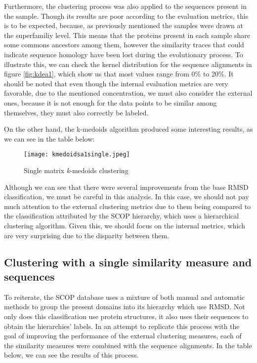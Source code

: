 Furthermore, the clustering process was also applied to the sequences present in the sample. Though its results are poor according to the evaluation metrics, this is to be expected, because, as previously mentioned the samples were drawn at the superfamiliy level. This means that the proteins present in each sample share some commons ancestors among them, however the similarity traces that could indicate sequence homology have been lost during the evolutionary process. To illustrate this, we can check the kernel distribution for the sequence alignments in figure \ref{fig:kdea1}, which show us that most values range from 0\% to 20\%. It should be noted that even though the internal evaluation metrics are very favorable, due to the mentioned concentration, we must also consider the external ones, because it is not enough for the data points to be similar among themselves, they must also correctly be labeled.

On the other hand, the k-medoids algorithm produced some interesting results, as we can see in the table below:

\begin{figure}[htbp]
	\centering
	\texttt{[image: kmedoidsa1single.jpeg]}
	\caption{Single matrix \textit{k}-medoids clustering}
	\label{}
\end{figure}

Although we can see that there were several improvements from the base RMSD classification, we must be careful in this analysis. In this case, we should not pay much attention to the external clustering metrics due to them being compared to the classification attributed by the SCOP hierarchy, which uses a hierarchical clustering algorithm. Given this, we should focus on the internal metrics, which are very surprising due to the disparity between them.


\subsection{Clustering with a single similarity measure and sequences}

To reiterate, the SCOP database uses a mixture of both manual and automatic methods to group the present domains into its hierarchy which use RMSD. Not only does this classification use protein structures, it also uses their sequences to obtain the hierarchies' labels. In an attempt to replicate this process with the goal of improving the performance of the external clustering measures, each of the similarity measures were combined with the sequence alignments. In the table below, we can see the results of this process.

